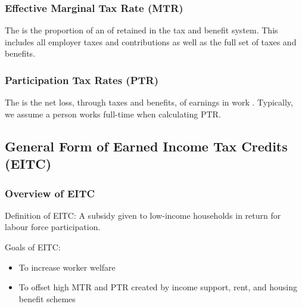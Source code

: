         \subsubsection{Effective Marginal Tax Rate (MTR)}

            The  is the proportion of an  of  retained in the tax and benefit system. This includes all employer taxes and contributions as well as the full set of taxes and benefits.
            
        \subsubsection{Participation Tax Rates (PTR)}

            The  is the net loss, through taxes and benefits, of earnings in work . Typically, we assume a person works full-time when calculating PTR.

    \subsection{General Form of Earned Income Tax Credits (EITC)}

        \subsubsection{Overview of EITC}

        Definition of EITC: A subsidy given to low-income households in return for labour force participation.

        Goals of EITC:
        \begin{itemize}
            \item To increase worker welfare
            \item To offset high MTR and PTR created by income support, rent, and housing benefit schemes
        \end{itemize}

